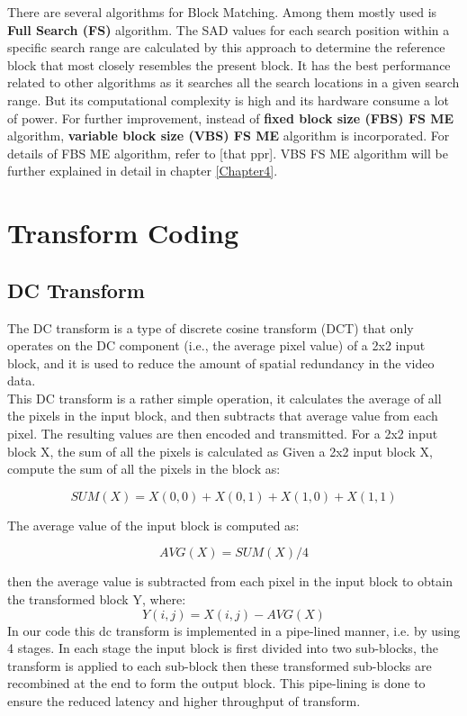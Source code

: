 There are several algorithms for Block Matching. Among them mostly used is \textbf{Full Search (FS)} algorithm. The SAD values for each search position within a specific search range are calculated by this approach to determine the reference block that most closely resembles the present block. It has the best performance related to other algorithms as it searches all the search locations in a given search range. But its computational complexity is high and its hardware consume a lot of power. For further improvement, instead of \textbf{fixed block size (FBS) FS ME} algorithm, \textbf{variable block size (VBS) FS ME} algorithm is incorporated. For details of FBS ME algorithm, refer to [that ppr]. VBS FS ME algorithm will be further explained in detail in chapter \ref{Chapter4}.


\section{Transform Coding}

\subsection{DC Transform}
The DC transform is a type of discrete cosine transform (DCT) that only operates on the DC component (i.e., the average pixel value) of a 2x2 input block, and it is used to reduce the amount of spatial redundancy in the video data.\\
This DC transform is a rather simple operation, it calculates the average of all the pixels in the input block, and then subtracts that average value from each pixel. The resulting values are then encoded and transmitted. For a 2x2 input block X, the sum of all the pixels is calculated as Given a 2x2 input block X, compute the sum of all the pixels in the block as: 

\begin{equation}
	SUM(X) = X(0,0) + X(0,1) + X(1,0) + X(1,1)
\end{equation}

The average value of the input block is computed as:

\begin{equation}
 AVG(X) = SUM(X) / 4
\end{equation}

then the average value is subtracted from each pixel in the input block to obtain the transformed block Y, where:
\begin{equation}
 	Y(i,j) = X(i,j) - AVG(X) 
\end{equation} 	
In our code this dc transform is implemented in a pipe-lined manner, i.e. by using 4 stages. In each stage the input block is first divided into two sub-blocks, the transform is applied to each sub-block then these transformed sub-blocks are recombined at the end to form the output block. This pipe-lining is done to ensure the reduced latency and higher throughput of transform. 

